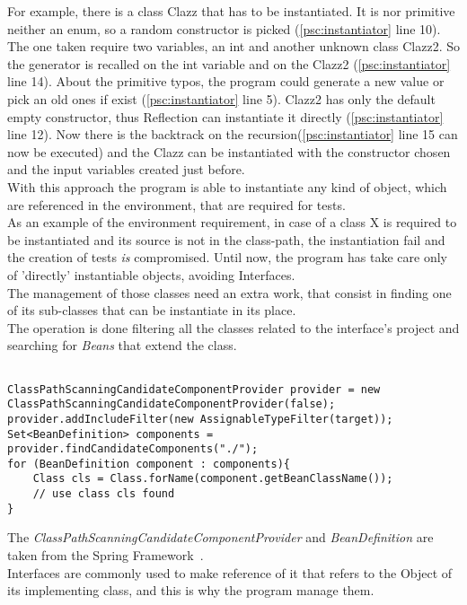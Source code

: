 For example, there is a class Clazz that has to be instantiated.
It is nor primitive neither an enum, so a random constructor is picked (\ref{psc:instantiator} line 10).
The one taken require two variables, an int and another unknown class Clazz2.
So the generator is recalled on the int variable and on the Clazz2 (\ref{psc:instantiator} line 14).
About the primitive typos, the program could generate a new value or pick an old ones if exist (\ref{psc:instantiator} line 5).
Clazz2 has only the default empty constructor, thus Reflection can instantiate it directly (\ref{psc:instantiator} line 12).
Now there is the backtrack on the recursion(\ref{psc:instantiator} line 15 can now be executed) and the Clazz can be instantiated with the constructor chosen and the input variables created just before.\\
With this approach the program is able to instantiate any kind of object, which are referenced in the environment, that are required for tests.\\
As an example of the environment requirement, in case of a class X is required to be instantiated and its source is not in the class-path, the instantiation fail and the creation of tests \emph{is} compromised.
Until now, the program has take care only of 'directly' instantiable objects, avoiding Interfaces.\\
The management of those classes need an extra work, that consist in finding one of its sub-classes that can be instantiate in its place.\\
The operation is done filtering all the classes related to the interface's project and searching for \emph{Beans} that extend the class.\\
\begin{lstlisting}[caption={how to find a sub-class of an interface},label={lst:interfaceMngmnt}]% Start your code-block

ClassPathScanningCandidateComponentProvider provider = new ClassPathScanningCandidateComponentProvider(false);
provider.addIncludeFilter(new AssignableTypeFilter(target));
Set<BeanDefinition> components = provider.findCandidateComponents("./");
for (BeanDefinition component : components){
	Class cls = Class.forName(component.getBeanClassName());
	// use class cls found
}
\end{lstlisting}
The \emph{ClassPathScanningCandidateComponentProvider} and \emph{BeanDefinition} are taken from the Spring Framework~\cite{springFramework}.\\
Interfaces are commonly used to make reference of it that refers to the Object of its implementing class, and this is why the program manage them.